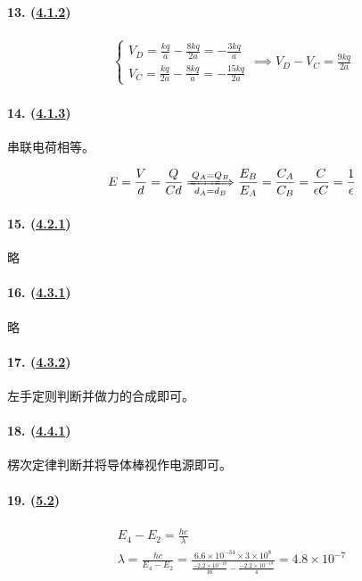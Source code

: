 \paragraph{13. (\hyperref[subsec:4.1.2]{4.1.2})}

\begin{gather*}
    \begin{cases}
        V_D=\frac{kq}{a}-\frac{8kq}{2a}=-\frac{3kq}{a}\\
        V_C=\frac{kq}{2a}-\frac{8kq}{a}=-\frac{15kq}{2a}
    \end{cases}\implies
    V_D-V_C=\frac{9kq}{2a}
\end{gather*}

\paragraph{14. (\hyperref[subsec:4.1.3]{4.1.3})} 串联电荷相等。

\begin{equation*}
    E=\frac{V}{d}=\frac{Q}{Cd}\xLongrightarrow[d_A=d_B]{Q_A=Q_B}
    \frac{E_B}{E_A}=\frac{C_A}{C_B}=\frac{C}{\epsilon C}=\frac1\epsilon
\end{equation*}

\paragraph{15. (\hyperref[subsec:4.2.1]{4.2.1})} 略
\paragraph{16. (\hyperref[subsec:4.3.1]{4.3.1})} 略
\paragraph{17. (\hyperref[subsec:4.3.2]{4.3.2})} 左手定则判断并做力的合成即可。
\paragraph{18. (\hyperref[subsec:4.4.1]{4.4.1})} 楞次定律判断并将导体棒视作电源即可。
\paragraph{19. (\hyperref[sec:5.2]{5.2})}

\begin{gather*}
    E_4-E_2=\frac{hc}{\lambda}\\
    \lambda=\frac{hc}{E_4-E_2}
    =\frac{6.6\times10^{-34}\times3\times10^8}{\frac{-2.2\times10^{-18}}{16}-\frac{-2.2\times10^{-18}}{4}}
    =4.8\times10^{-7}
\end{gather*}

